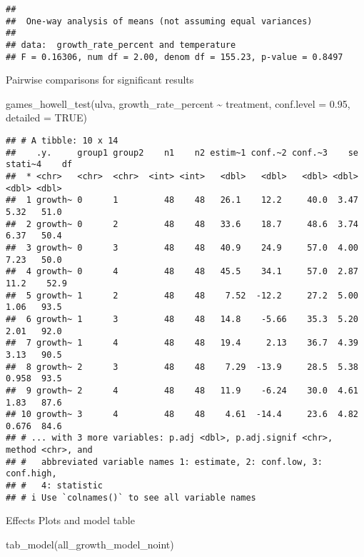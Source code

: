\documentclass[
]{article}
\newenvironment{Shaded}{\begin{snugshade}}{\end{snugshade}}
\newcommand{\AttributeTok}[1]{\textcolor[rgb]{0.77,0.63,0.00}{#1}}
\newcommand{\ConstantTok}[1]{\textcolor[rgb]{0.00,0.00,0.00}{#1}}
\newcommand{\FloatTok}[1]{\textcolor[rgb]{0.00,0.00,0.81}{#1}}
\newcommand{\FunctionTok}[1]{\textcolor[rgb]{0.00,0.00,0.00}{#1}}
\newcommand{\NormalTok}[1]{#1}
\newcommand{\SpecialCharTok}[1]{\textcolor[rgb]{0.00,0.00,0.00}{#1}}
\begin{document}
\begin{verbatim}
## 
##  One-way analysis of means (not assuming equal variances)
## 
## data:  growth_rate_percent and temperature
## F = 0.16306, num df = 2.00, denom df = 155.23, p-value = 0.8497
\end{verbatim}

Pairwise comparisons for significant results

\begin{Shaded}
\begin{Highlighting}[]
\FunctionTok{games\_howell\_test}\NormalTok{(ulva, growth\_rate\_percent }\SpecialCharTok{\textasciitilde{}}\NormalTok{ treatment, }\AttributeTok{conf.level =} \FloatTok{0.95}\NormalTok{, }\AttributeTok{detailed =} \ConstantTok{TRUE}\NormalTok{)}
\end{Highlighting}
\end{Shaded}

\begin{verbatim}
## # A tibble: 10 x 14
##    .y.     group1 group2    n1    n2 estim~1 conf.~2 conf.~3    se stati~4    df
##  * <chr>   <chr>  <chr>  <int> <int>   <dbl>   <dbl>   <dbl> <dbl>   <dbl> <dbl>
##  1 growth~ 0      1         48    48   26.1    12.2     40.0  3.47   5.32   51.0
##  2 growth~ 0      2         48    48   33.6    18.7     48.6  3.74   6.37   50.4
##  3 growth~ 0      3         48    48   40.9    24.9     57.0  4.00   7.23   50.0
##  4 growth~ 0      4         48    48   45.5    34.1     57.0  2.87  11.2    52.9
##  5 growth~ 1      2         48    48    7.52  -12.2     27.2  5.00   1.06   93.5
##  6 growth~ 1      3         48    48   14.8    -5.66    35.3  5.20   2.01   92.0
##  7 growth~ 1      4         48    48   19.4     2.13    36.7  4.39   3.13   90.5
##  8 growth~ 2      3         48    48    7.29  -13.9     28.5  5.38   0.958  93.5
##  9 growth~ 2      4         48    48   11.9    -6.24    30.0  4.61   1.83   87.6
## 10 growth~ 3      4         48    48    4.61  -14.4     23.6  4.82   0.676  84.6
## # ... with 3 more variables: p.adj <dbl>, p.adj.signif <chr>, method <chr>, and
## #   abbreviated variable names 1: estimate, 2: conf.low, 3: conf.high,
## #   4: statistic
## # i Use `colnames()` to see all variable names
\end{verbatim}

Effects Plots and model table

\begin{Shaded}
\begin{Highlighting}[]
\FunctionTok{tab\_model}\NormalTok{(all\_growth\_model\_noint)}
\end{Highlighting}
\end{Shaded}
\end{document}
